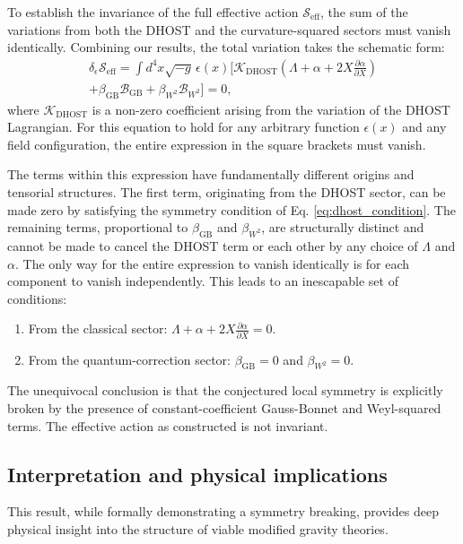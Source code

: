 \documentclass[twocolumn]{aastex631}
\begin{document}
To establish the invariance of the full effective action $\mathcal{S}_{\text{eff}}$, the sum of the variations from both the DHOST and the curvature-squared sectors must vanish identically. Combining our results, the total variation takes the schematic form:
\begin{multline}
\delta_\epsilon \mathcal{S}_{\text{eff}} = \int d^4x \sqrt{-g} \, \epsilon(x) \bigg[ \mathcal{K}_{\text{DHOST}} \left( \Lambda + \alpha + 2X \frac{\partial \alpha}{\partial X} \right) \\
+ \beta_{\text{GB}} \mathcal{B}_{\text{GB}} + \beta_{W^2} \mathcal{B}_{W^2} \bigg] = 0,
\end{multline}
where $\mathcal{K}_{\text{DHOST}}$ is a non-zero coefficient arising from the variation of the DHOST Lagrangian. For this equation to hold for any arbitrary function $\epsilon(x)$ and any field configuration, the entire expression in the square brackets must vanish.

The terms within this expression have fundamentally different origins and tensorial structures. The first term, originating from the DHOST sector, can be made zero by satisfying the symmetry condition of Eq. \eqref{eq:dhost_condition}. The remaining terms, proportional to $\beta_{\text{GB}}$ and $\beta_{W^2}$, are structurally distinct and cannot be made to cancel the DHOST term or each other by any choice of $\Lambda$ and $\alpha$. The only way for the entire expression to vanish identically is for each component to vanish independently. This leads to an inescapable set of conditions:
\begin{enumerate}
    \item From the classical sector: $\Lambda + \alpha + 2X \frac{\partial \alpha}{\partial X} = 0$.
    \item From the quantum-correction sector: $\beta_{\text{GB}} = 0$ and $\beta_{W^2} = 0$.
\end{enumerate}
The unequivocal conclusion is that the conjectured local symmetry is explicitly broken by the presence of constant-coefficient Gauss-Bonnet and Weyl-squared terms. The effective action as constructed is not invariant.

\subsection{Interpretation and physical implications}

This result, while formally demonstrating a symmetry breaking, provides deep physical insight into the structure of viable modified gravity theories.
\end{document}

